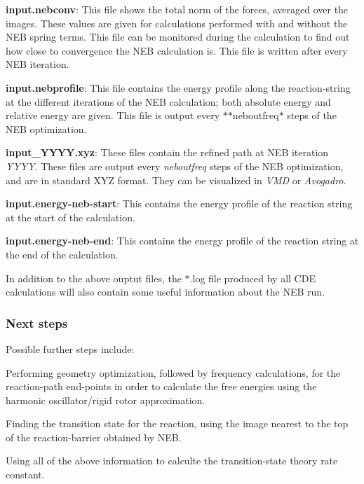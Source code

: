 \begin{DoxyItemize}
\item {\bfseries input.\+nebconv}\+: This file shows the total norm of the forces, averaged over the images. These values are given for calculations performed with and without the N\+EB spring terms. This file can be monitored during the calculation to find out how close to convergence the N\+EB calculation is. This file is written after every N\+EB iteration.
\item {\bfseries input.\+nebprofile}\+: This file contains the energy profile along the reaction-\/string at the different iterations of the N\+EB calculation; both absolute energy and relative energy are given. This file is output every $\ast$$\ast$neboutfreq$\ast$ steps of the N\+EB optimization.
\item {\bfseries input\+\_\+\+Y\+Y\+Y\+Y.\+xyz}\+: These files contain the refined path at N\+EB iteration {\itshape Y\+Y\+YY}. These files are output every {\itshape neboutfreq} steps of the N\+EB optimization, and are in standard X\+YZ format. They can be visualized in {\itshape V\+MD} or {\itshape Avogadro}.
\item {\bfseries input.\+energy-\/neb-\/start}\+: This contains the energy profile of the reaction string at the start of the calculation.
\item {\bfseries input.\+energy-\/neb-\/end}\+: This contains the energy profile of the reaction string at the end of the calculation.
\end{DoxyItemize}

In addition to the above ouptut files, the $\ast$.log file produced by all C\+DE calculations will also contain some useful information about the N\+EB run.

\subsubsection*{Next steps}

Possible further steps include\+:


\begin{DoxyItemize}
\item Performing geometry optimization, followed by frequency calculations, for the reaction-\/path end-\/points in order to calculate the free energies using the harmonic oscillator/rigid rotor approximation.
\item Finding the transition state for the reaction, using the image nearest to the top of the reaction-\/barrier obtained by N\+EB.
\item Using all of the above information to calculte the transition-\/state theory rate constant. 
\end{DoxyItemize}